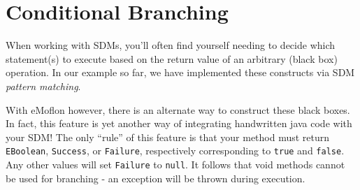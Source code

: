 \newpage
\hypertarget{sec:conBran}{}
\section{Conditional Branching}


When working with SDMs, you'll often find yourself needing to decide which statement(s) to execute based on the return value of an arbitrary (black box)
operation. In our example so far, we have implemented these constructs via SDM \emph{pattern matching}. 

With eMoflon however, there is an alternate way to
construct these black boxes. In fact, this feature is yet another way of integrating handwritten java code with your SDM! The only ``rule'' of this feature is that your
method must return \texttt{EBoolean}, \texttt{Success}, or \texttt{Failure}, respectively corresponding to \texttt{true} and \texttt{false}. Any other values
will set \texttt{Failure} to \texttt{null}. It follows that void methods cannot be used for branching - an exception will be thrown during execution.






